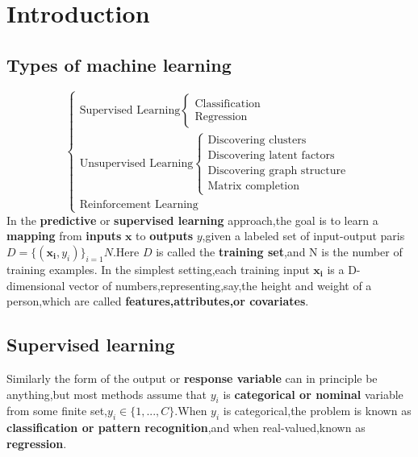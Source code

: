 \chapter{Introduction}
\label{chapter:Introduction}

\section{Types of machine learning}
\begin{equation}\nonumber
\begin{cases}
\text{Supervised Learning} \begin{cases} \text{Classification} \\ \text{Regression} \end{cases}\\
\text{Unsupervised Learning} \begin{cases} \text{Discovering clusters} \\ \text{Discovering latent factors} \\ \text{Discovering graph structure} \\ \text{Matrix completion} \end{cases}\\
\text{Reinforcement Learning}
\end{cases}
\end{equation}
In the \textbf{predictive} or \textbf{supervised learning} approach,the goal is to learn a \textbf{mapping} from \textbf{inputs} $\mathbf{x}$ to \textbf{outputs} $y$,given a labeled set of input-output paris $D=\{(\mathbf{x_i},y_i)\}_{i=1}{N}$.Here $D$ is called the \textbf{training set},and N is the number of training examples.
In the simplest setting,each training input $\mathbf{x_i}$ is a D-dimensional vector of numbers,representing,say,the height and weight of a person,which are called \textbf{features,attributes,or covariates}.

\section{Supervised learning}
  Similarly the form of the output or \textbf{response variable} can in principle be anything,but most methods assume that $y_i$ is \textbf{categorical or nominal} variable from some finite set,$y_i \in \{1,...,C\}$.When $y_i$ is categorical,the problem is known as \textbf{classification or pattern recognition},and when real-valued,known as \textbf{regression}.
